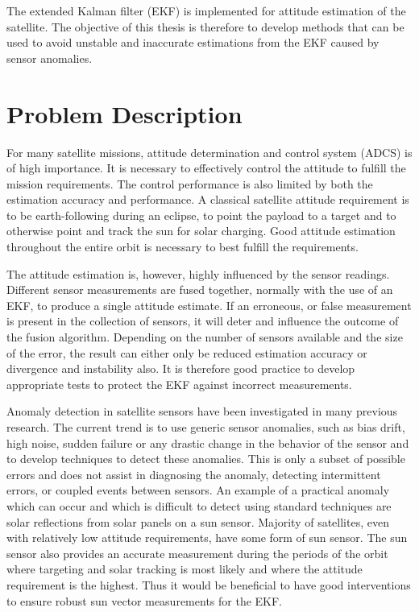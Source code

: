 The extended Kalman filter (EKF) is implemented for attitude estimation of the satellite. The objective of this thesis is therefore to develop methods that can be used to avoid unstable and inaccurate estimations from the EKF caused by sensor anomalies.

\section{Problem Description}
For many satellite missions, attitude determination and control system (ADCS) is of high importance. It is necessary to effectively control the attitude to fulfill the mission requirements. The control performance is also limited by both the estimation accuracy and performance. A classical satellite attitude requirement is to be earth-following during an eclipse, to point the payload to a target and to otherwise point and track the sun for solar charging. Good attitude estimation throughout the entire orbit is necessary to best fulfill the requirements.

The attitude estimation is, however, highly influenced by the sensor readings. Different sensor measurements are fused together, normally with the use of an EKF, to produce a single attitude estimate. If an erroneous, or false measurement is present in the collection of sensors, it will deter and influence the outcome of the fusion algorithm.  Depending on the number of sensors available and the size of the error, the result can either only be reduced estimation accuracy or divergence and instability also. It is therefore good practice to develop appropriate tests to protect the EKF against incorrect measurements. 

Anomaly detection in satellite sensors have been investigated in many previous research. The current trend is to use generic sensor anomalies, such as bias drift, high noise, sudden failure or any drastic change in the behavior of the sensor and to develop techniques to detect these anomalies. This is only a subset of possible errors and does not assist in diagnosing the anomaly, detecting intermittent errors, or coupled events between sensors. An example of a practical anomaly which can occur and which is difficult to detect using standard techniques are solar reflections from solar panels on a sun sensor. Majority of satellites, even with relatively low attitude requirements, have some form of sun sensor. The sun sensor also provides an accurate measurement during the periods of the orbit where targeting and solar tracking is most likely and where the attitude requirement is the highest. Thus it would be beneficial to have good interventions to ensure robust sun vector measurements for the EKF.

